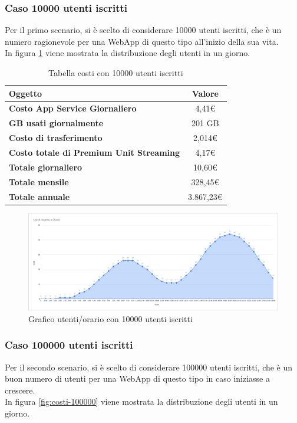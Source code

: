 \subsubsection{Caso 10000 utenti iscritti}
Per il primo scenario, si è scelto di considerare 10000 utenti iscritti, che è un numero ragionevole per una WebApp di questo tipo all'inizio della sua vita.\\
In figura \ref{fig:costi-10000} viene mostrata la distribuzione degli utenti in un giorno.
\begin{table}[H]
    \label{tab:costi-10000}
    \begin{tabularx}{\textwidth}{|X|c|}
        \hline
        \textbf{Oggetto} & \textbf{Valore} \\\hline
        
        \textbf{Costo App Service Giornaliero} & {4,41€} \\ 
        \hline
        \textbf{GB usati giornalmente} & {201 GB} \\ 
        \hline
        \textbf{Costo di trasferimento} & {2,014€}\\
        \hline
        \textbf{Costo totale di Premium Unit Streaming} & {4,17€}\\  
        \hline
        \textbf{Totale giornaliero} & {10,60€}\\  
        \hline
        \textbf{Totale mensile} & {328,45€}\\  
        \hline
        \textbf{Totale annuale} & {3.867,23€}\\  
        \hline
    \end{tabularx}
    \caption{Tabella costi con 10000 utenti iscritti}
\end{table}
\begin{figure}[H]
    \centering
    \includegraphics[scale=0.3]{images/costi/10kuser.png}
    \caption{Grafico utenti/orario con 10000 utenti iscritti}
    \label{fig:costi-10000}
\end{figure}
\pagebreak
\subsubsection{Caso 100000 utenti iscritti}
Per il secondo scenario, si è scelto di considerare 100000 utenti iscritti, che è un buon numero di utenti per una WebApp di questo tipo in caso iniziasse a crescere.\\
In figura \ref{fig:costi-100000} viene mostrata la distribuzione degli utenti in un giorno.

